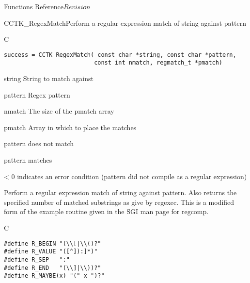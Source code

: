 \begin{cactuspart}{ Functions Reference}{}{$Revision$}
\begin{FunctionDescription}{CCTK\_RegexMatch}{Perform a regular expression match of string against pattern}
\label{CCTK-RegexMatch}
\begin{SynopsisSection}
\begin{Synopsis}{C}
\begin{verbatim}success = CCTK_RegexMatch( const char *string, const char *pattern,
                          const int nmatch, regmatch_t *pmatch)\end{verbatim}
\end{Synopsis}
\end{SynopsisSection}
\begin{ParameterSection}
\begin{Parameter}{string}
String to match against
\end{Parameter}
\begin{Parameter}{pattern}
Regex pattern
\end{Parameter}
\begin{Parameter}{nmatch}
The size of the pmatch array
\end{Parameter}
\begin{Parameter}{pmatch}
Array in which to place the matches
\end{Parameter}
\end{ParameterSection}
\begin{ResultSection}
\begin{Result}{0} pattern does not match\end{Result}
\begin{Result}{1} pattern matches\end{Result}
\begin{Result}{< 0} indicates an error condition (pattern did not compile as a
    regular expression) \end{Result}
\end{ResultSection}
\begin{Discussion}
Perform a regular expression match of string against pattern.
Also returns the specified number of matched substrings as
give by regexec.
This is a modified form of the example routine given in the SGI
man page for regcomp.
\end{Discussion}
\begin{ExampleSection}
\begin{Example}{C}
\begin{verbatim}
#define R_BEGIN "(\\[|\\()?"
#define R_VALUE "([^]):]*)"
#define R_SEP   ":"
#define R_END   "(\\]|\\))?"
#define R_MAYBE(x) "(" x ")?"


\end{verbatim}
\end{Example}
\end{ExampleSection}
\end{FunctionDescription}
\end{cactuspart}
